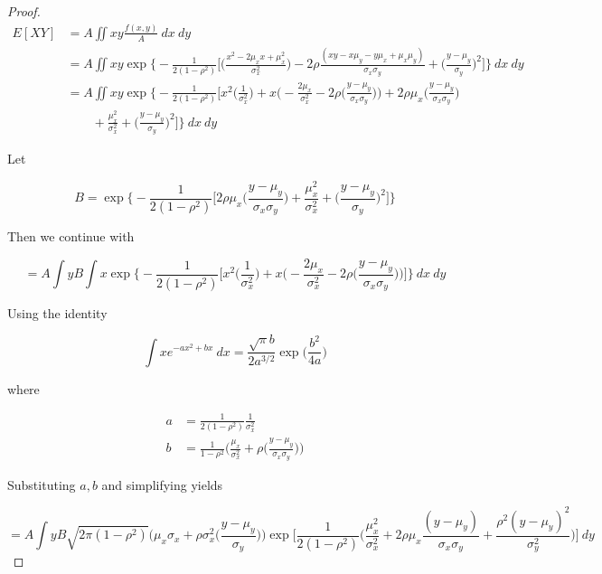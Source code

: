 \documentclass[10pt, oneside]{article}
\begin{document}
\begin{enumerate}[label=9.\arabic*]
\begin{proof}
\begin{align*}
E[XY] &= A \iint xy \frac{f(x,y)}{A} \ dx \ dy \\
&= A \iint xy \exp \bigg\{ -\frac{1}{2(1-\rho^2)} \bigg[ \bigg( \frac{x^2 - 2\mu_x x + \mu^2_x}{\sigma^2_x} \bigg) - 2\rho \frac{(xy - x\mu_y - y\mu_x + \mu_x \mu_y)}{\sigma_x \sigma_y} + \bigg( \frac{y - \mu_y}{\sigma_y} \bigg)^2 \bigg] \bigg\} \ dx \ dy \\
&= A \iint xy \exp \bigg\{ -\frac{1}{2(1-\rho^2)} \bigg[ x^2 \bigg( \frac{1}{\sigma^2_x} \bigg) + x \bigg( -\frac{2\mu_x}{\sigma^2_x} - 2\rho \bigg( \frac{y-\mu_y}{\sigma_x \sigma_y} \bigg) \bigg) + 2\rho \mu_x \bigg( \frac{y-\mu_y}{\sigma_x \sigma_y} \bigg) \\
&\quad \quad + \frac{\mu^2_x}{\sigma^2_x} +\bigg( \frac{y - \mu_y}{\sigma_y} \bigg)^2 \bigg] \bigg\} \ dx \ dy
\end{align*}

Let

\[ B = \exp \bigg\{ -\frac{1}{2(1-\rho^2)} \bigg[ 2\rho \mu_x \bigg( \frac{y-\mu_y}{\sigma_x \sigma_y} \bigg) + \frac{\mu^2_x}{\sigma^2_x} + \bigg( \frac{y - \mu_y}{\sigma_y} \bigg)^2 \bigg] \bigg\} \]

Then we continue with

\[ = A \int yB \int x \exp \bigg\{ -\frac{1}{2(1-\rho^2)} \bigg[ x^2 \bigg( \frac{1}{\sigma^2_x} \bigg) + x \bigg( -\frac{2\mu_x}{\sigma^2_x} - 2\rho \bigg( \frac{y - \mu_y}{\sigma_x \sigma_y} \bigg) \bigg) \bigg] \bigg\} \ dx \ dy \]

Using the identity

\[ \int x e^{-ax^2 + bx} \ dx = \frac{\sqrt{\pi} b}{2a^{3/2}} \exp \bigg( \frac{b^2}{4a} \bigg) \]

where

\begin{align*}
a &= \frac{1}{2(1-\rho^2)} \frac{1}{\sigma^2_x} \\
b &= \frac{1}{1-\rho^2} \bigg( \frac{\mu_x}{\sigma^2_x} + \rho \bigg( \frac{y - \mu_y}{\sigma_x \sigma_y} \bigg) \bigg)
\end{align*}

Substituting $a,b$ and simplifying yields

\[ = A \int y B \sqrt{2 \pi (1-\rho^2)} \bigg( \mu_x \sigma_x + \rho \sigma^2_x \bigg( \frac{y-\mu_y}{\sigma_y} \bigg) \bigg) \exp \bigg[ \frac{1}{2(1-\rho^2)} \bigg( \frac{\mu^2_x}{\sigma^2_x} + 2\rho \mu_x \frac{(y - \mu_y)}{\sigma_x \sigma_y} + \frac{\rho^2 (y-\mu_y)^2}{\sigma^2_y} \bigg) \bigg] \ dy  \]


\end{proof}
\end{enumerate}
\end{document}
